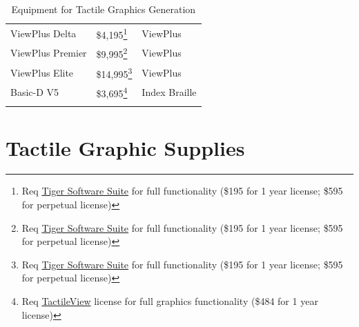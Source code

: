 \documentclass[14pt,letterpaper,twoside]{extreport}
\begin{document}
\begin{longtable}[]{@{}
	>{\raggedright\arraybackslash}m{}
	>{\raggedright\arraybackslash}m{}
	>{\raggedright\arraybackslash}b{}@{}
	}
	ViewPlus Delta                                      & \$4,195\footnote{Req \href{https://viewplus.com/product/tiger-software-suite8/}{Tiger Software Suite} for full functionality (\$195 for 1 year license; \$595 for perpetual license)}  & ViewPlus            \\[1.5em]
	ViewPlus Premier                                    & \$9,995\footnote{Req \href{https://viewplus.com/product/tiger-software-suite8/}{Tiger Software Suite} for full functionality (\$195 for 1 year license; \$595 for perpetual license)}  & ViewPlus            \\[1.5em]
	ViewPlus Elite                                      & \$14,995\footnote{Req \href{https://viewplus.com/product/tiger-software-suite8/}{Tiger Software Suite} for full functionality (\$195 for 1 year license; \$595 for perpetual license)} & ViewPlus            \\[1.5em]
	Basic-D V5                                          & \$3,695\footnote{Req \href{https://tactileview.com/}{TactileView} license for full graphics functionality (\$484 for 1 year license)}                                                  & Index Braille       \\[1.5em]\hline
	\caption{ Equipment for Tactile Graphics Generation}
\end{longtable}

\pagebreak
	\hypertarget{tactile-paper}{}\section{Tactile Graphic Supplies}\label{tactile-paper}
\end{document}

